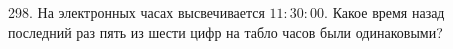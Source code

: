 298. На электронных часах высвечивается $11:30:00.$ Какое время назад последний раз пять из шести цифр на табло часов были одинаковыми?\\
